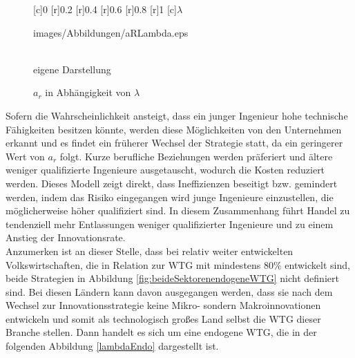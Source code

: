 	\begin{figure}[h]
		\vspace{0.13cm}
		\centering
		\psfrag{-}{-}
		[c]{\scriptsize{0}}
		[r]{\scriptsize{0.2}}
		[r]{\scriptsize{0.4}}
		[r]{\scriptsize{0.6}}
		[r]{\scriptsize{0.8}}
		[r]{\scriptsize{1}}
		[c]{$\lambda$}
		\begin{overpic}[width=0.5\textwidth]{images/Abbildungen/aRLambda.eps}
			
		\end{overpic}\\
		\hfill\footnotesize{}  eigene Darstellung
		\caption{$a_r$ in Abhängigkeit von $\lambda$ }
		\label{fig:VerhaltenAR}
	\end{figure}


Sofern die Wahrscheinlichkeit ansteigt, dass ein junger Ingenieur hohe technische Fähigkeiten besitzen könnte, werden diese Möglichkeiten von den Unternehmen erkannt und es findet ein früherer Wechsel der Strategie statt, da ein geringerer Wert von $a_r$ folgt. Kurze berufliche Beziehungen werden präferiert und ältere  weniger qualifizierte Ingenieure ausgetauscht, wodurch die Kosten reduziert werden. Dieses Modell zeigt direkt, dass Ineffizienzen beseitigt bzw. gemindert werden, indem das Risiko eingegangen wird junge Ingenieure einzustellen, die möglicherweise höher qualifiziert sind.
In diesem Zusammenhang führt Handel zu tendenziell mehr Entlassungen weniger qualifizierter Ingenieure und zu einem Anstieg der Innovationsrate.\\
Anzumerken ist an dieser Stelle, dass bei relativ weiter entwickelten Volkswirtschaften, die in Relation zur WTG mit mindestens 80\% entwickelt sind, beide Strategien in Abbildung \ref{fig:beideSektorenendogeneWTG} nicht definiert sind. Bei diesen Ländern kann davon ausgegangen werden, dass sie nach dem Wechsel zur Innovationsstrategie keine Mikro- sondern Makroinnovationen entwickeln und somit als technologisch gro{\ss}es Land selbst die WTG dieser Branche stellen. Dann handelt es sich um eine endogene WTG, die in der folgenden Abbildung \ref{lambdaEndo} dargestellt ist.\\



